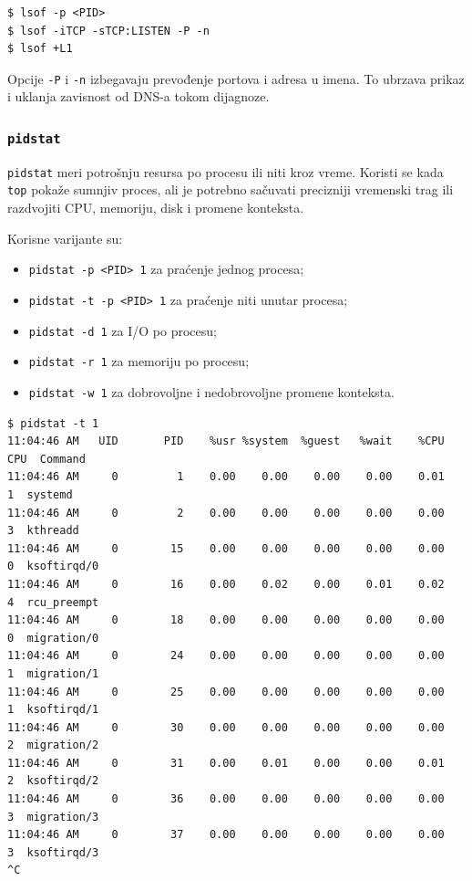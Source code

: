 \begin{verbatim}
$ lsof -p <PID>
$ lsof -iTCP -sTCP:LISTEN -P -n
$ lsof +L1
\end{verbatim}

Opcije \texttt{-P} i \texttt{-n} izbegavaju prevođenje portova i adresa u imena. To ubrzava prikaz i uklanja zavisnost od DNS-a tokom dijagnoze.

\subsubsection{\texorpdfstring{\texttt{pidstat}}{pidstat}}\label{pidstat}

\texttt{pidstat} meri potrošnju resursa po procesu ili niti kroz vreme. Koristi se kada \texttt{top} pokaže sumnjiv proces, ali je potrebno sačuvati precizniji vremenski trag ili razdvojiti CPU, memoriju, disk i promene konteksta.

Korisne varijante su:

\begin{itemize}
\tightlist
\item
  \texttt{pidstat -p <PID> 1} za praćenje jednog procesa;
\item
  \texttt{pidstat -t -p <PID> 1} za praćenje niti unutar procesa;
\item
  \texttt{pidstat -d 1} za I/O po procesu;
\item
  \texttt{pidstat -r 1} za memoriju po procesu;
\item
  \texttt{pidstat -w 1} za dobrovoljne i nedobrovoljne promene konteksta.
\end{itemize}

\begin{verbatim}
$ pidstat -t 1
11:04:46 AM   UID       PID    %usr %system  %guest   %wait    %CPU   CPU  Command
11:04:46 AM     0         1    0.00    0.00    0.00    0.00    0.01     1  systemd
11:04:46 AM     0         2    0.00    0.00    0.00    0.00    0.00     3  kthreadd
11:04:46 AM     0        15    0.00    0.00    0.00    0.00    0.00     0  ksoftirqd/0
11:04:46 AM     0        16    0.00    0.02    0.00    0.01    0.02     4  rcu_preempt
11:04:46 AM     0        18    0.00    0.00    0.00    0.00    0.00     0  migration/0
11:04:46 AM     0        24    0.00    0.00    0.00    0.00    0.00     1  migration/1
11:04:46 AM     0        25    0.00    0.00    0.00    0.00    0.00     1  ksoftirqd/1
11:04:46 AM     0        30    0.00    0.00    0.00    0.00    0.00     2  migration/2
11:04:46 AM     0        31    0.00    0.01    0.00    0.00    0.01     2  ksoftirqd/2
11:04:46 AM     0        36    0.00    0.00    0.00    0.00    0.00     3  migration/3
11:04:46 AM     0        37    0.00    0.00    0.00    0.00    0.00     3  ksoftirqd/3
^C
\end{verbatim}

